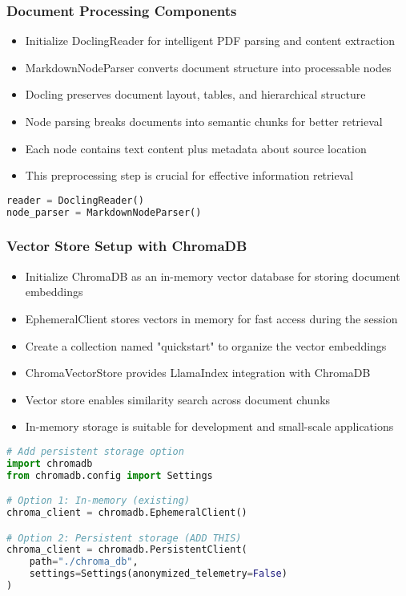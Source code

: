 \begin{frame}[fragile]\frametitle{Document Processing Components}
      \begin{itemize}
          \item Initialize DoclingReader for intelligent PDF parsing and content extraction
          \item MarkdownNodeParser converts document structure into processable nodes
          \item Docling preserves document layout, tables, and hierarchical structure
          \item Node parsing breaks documents into semantic chunks for better retrieval
          \item Each node contains text content plus metadata about source location
          \item This preprocessing step is crucial for effective information retrieval
      \end{itemize}
      
\begin{lstlisting}[language=Python, basicstyle=\tiny]
reader = DoclingReader()
node_parser = MarkdownNodeParser()
\end{lstlisting}
\end{frame}

\begin{frame}[fragile]\frametitle{Vector Store Setup with ChromaDB}
      \begin{itemize}
          \item Initialize ChromaDB as an in-memory vector database for storing document embeddings
          \item EphemeralClient stores vectors in memory for fast access during the session
          \item Create a collection named "quickstart" to organize the vector embeddings
          \item ChromaVectorStore provides LlamaIndex integration with ChromaDB
          \item Vector store enables similarity search across document chunks
          \item In-memory storage is suitable for development and small-scale applications
      \end{itemize}
      
\begin{lstlisting}[language=Python, basicstyle=\tiny]
# Add persistent storage option
import chromadb
from chromadb.config import Settings

# Option 1: In-memory (existing)
chroma_client = chromadb.EphemeralClient()

# Option 2: Persistent storage (ADD THIS)
chroma_client = chromadb.PersistentClient(
    path="./chroma_db",
    settings=Settings(anonymized_telemetry=False)
)
\end{lstlisting}
\end{frame}

